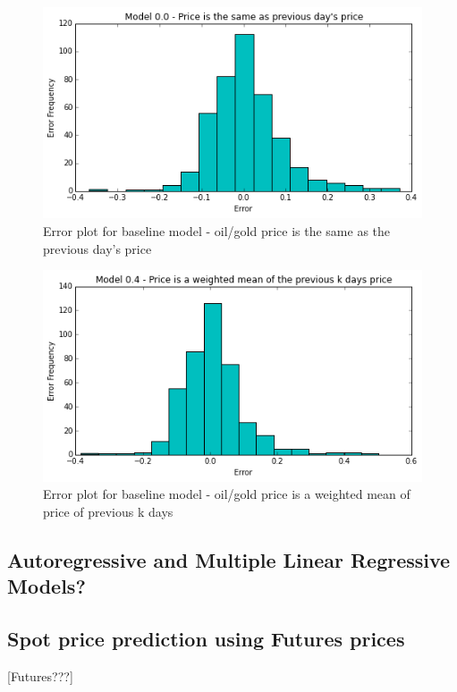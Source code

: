 \documentclass[runningheads]{llncs}
\begin{document}
\begin{figure}
\centering
\includegraphics[width=\textwidth]{baseline1_error_histogram.png}
\caption{Error plot for baseline model - oil/gold price is the same as the previous day's price}
\label{fig:baseline1_error_histogram.png}
\end{figure}

\begin{figure}
\centering
\includegraphics[width=\textwidth]{baseline2_error_histogram.png}
\caption{Error plot for baseline model - oil/gold price is a weighted mean of price of previous k days}
\label{fig:baseline2_error_histogram.png}
\end{figure}

\subsection{Autoregressive and Multiple Linear Regressive Models?}

\subsection{Spot price prediction using Futures prices}
[Futures???]\\
\end{document}
